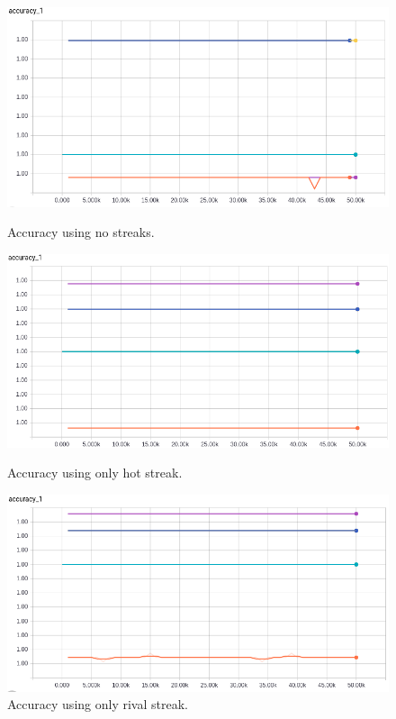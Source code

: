 \documentclass{article} %
\begin{document}
\begin{figure}[!htb]
  \includegraphics[width=\linewidth]{plots/model1/probability/streak-/accuracy.png}
  \caption{Accuracy using no streaks.}\label{fig:probability--accuracy}
\endminipage\hfill
{}
  \includegraphics[width=\linewidth]{plots/model1/probability/streak-h/accuracy.png}
  \caption{Accuracy using only hot streak.}\label{fig:probability-h-accuracy}
\endminipage\hfill
{}%
  \includegraphics[width=\linewidth]{plots/model1/probability/streak-r/accuracy.png}
  \caption{Accuracy using only rival streak.}\label{fig:probability-r-accuracy}

\end{figure}
\end{document}
